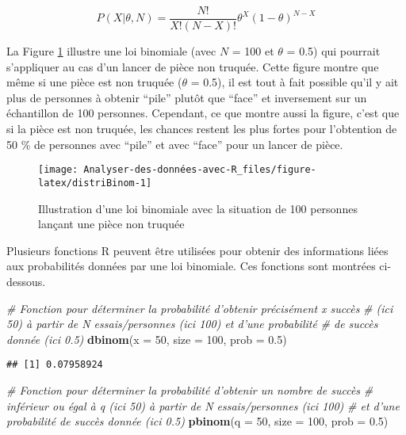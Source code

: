 \documentclass[
  french,
]{book}
\newenvironment{Shaded}{\begin{snugshade}}{\end{snugshade}}
\newcommand{\CommentTok}[1]{\textcolor[rgb]{0.56,0.35,0.01}{\textit{#1}}}
\newcommand{\DataTypeTok}[1]{\textcolor[rgb]{0.13,0.29,0.53}{#1}}
\newcommand{\DecValTok}[1]{\textcolor[rgb]{0.00,0.00,0.81}{#1}}
\newcommand{\FloatTok}[1]{\textcolor[rgb]{0.00,0.00,0.81}{#1}}
\newcommand{\KeywordTok}[1]{\textcolor[rgb]{0.13,0.29,0.53}{\textbf{#1}}}
\newcommand{\NormalTok}[1]{#1}
\begin{document}
\[P(X | \theta, N) = \frac{N!}{X!(N-X)!}\theta^X(1-\theta)^{N-X}\]

La Figure \ref{fig:distriBinom} illustre une loi binomiale (avec \(N\) = 100 et \(\theta\) = 0.5) qui pourrait s'appliquer au cas d'un lancer de pièce non truquée. Cette figure montre que même si une pièce est non truquée (\(\theta\) = 0.5), il est tout à fait possible qu'il y ait plus de personnes à obtenir ``pile'' plutôt que ``face'' et inversement sur un échantillon de 100 personnes. Cependant, ce que montre aussi la figure, c'est que si la pièce est non truquée, les chances restent les plus fortes pour l'obtention de 50 \% de personnes avec ``pile'' et avec ``face'' pour un lancer de pièce.

\begin{figure}

{\centering \texttt{[image: Analyser-des-données-avec-R\_files/figure-latex/distriBinom-1]} 

}

\caption{Illustration d'une loi binomiale avec la situation de 100 personnes lançant une pièce non truquée}\label{fig:distriBinom}
\end{figure}

Plusieurs fonctions R peuvent être utilisées pour obtenir des informations liées aux probabilités données par une loi binomiale. Ces fonctions sont montrées ci-dessous.

\begin{Shaded}
\begin{Highlighting}[]
\CommentTok{# Fonction pour déterminer la probabilité d'obtenir précisément x succès }
\CommentTok{# (ici 50) à partir de N essais/personnes (ici 100) et d'une probabilité }
\CommentTok{# de succès donnée (ici 0.5)}
\KeywordTok{dbinom}\NormalTok{(}\DataTypeTok{x =} \DecValTok{50}\NormalTok{, }\DataTypeTok{size =} \DecValTok{100}\NormalTok{, }\DataTypeTok{prob =} \FloatTok{0.5}\NormalTok{)}
\end{Highlighting}
\end{Shaded}

\begin{verbatim}
## [1] 0.07958924
\end{verbatim}

\begin{Shaded}
\begin{Highlighting}[]
\CommentTok{# Fonction pour déterminer la probabilité d'obtenir un nombre de succès}
\CommentTok{# inférieur ou égal à q (ici 50) à partir de N essais/personnes (ici 100) }
\CommentTok{# et d'une probabilité de succès donnée (ici 0.5)}
\KeywordTok{pbinom}\NormalTok{(}\DataTypeTok{q =} \DecValTok{50}\NormalTok{, }\DataTypeTok{size =} \DecValTok{100}\NormalTok{, }\DataTypeTok{prob =} \FloatTok{0.5}\NormalTok{)}
\end{Highlighting}
\end{Shaded}
\end{document}

